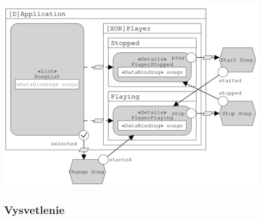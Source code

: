 \documentclass[12pt,twoside,slovak,a4paper]{article}
\begin{document}
\includegraphics[scale=0.585]{model.pdf}

\subsection{Vysvetlenie}



\end{document}
